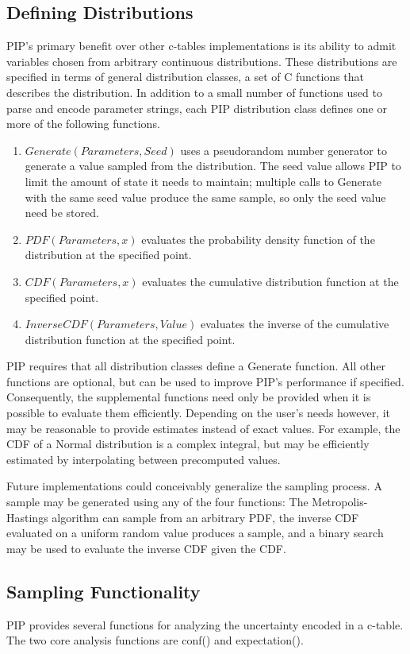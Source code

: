 \subsection{Defining Distributions}
PIP's primary benefit over other c-tables implementations is its ability to admit variables chosen from arbitrary continuous distributions.  These distributions are specified in terms of general distribution classes, a set of C functions that describes the distribution.  In addition to a small number of functions used to parse and encode parameter strings, each PIP distribution class defines one or more of the following functions.
\begin{enumerate}
\item $Generate(Parameters, Seed)$ uses a pseudorandom number generator to generate a value sampled from the distribution.  The seed value allows PIP to limit the amount of state it needs to maintain; multiple calls to Generate with the same seed value produce the same sample, so only the seed value need be stored.
\item $PDF(Parameters, x)$ evaluates the probability density function of the distribution at the specified point.  
\item $CDF(Parameters, x)$ evaluates the cumulative distribution function at the specified point.
\item $InverseCDF(Parameters, Value)$ evaluates the inverse of the cumulative distribution function at the specified point.
\end{enumerate}

PIP requires that all distribution classes define a Generate function.  All other functions are optional, but can be used to improve PIP's performance if specified.  Consequently, the supplemental functions need only be provided when it is possible to evaluate them efficiently.  Depending on the user's needs however, it may be reasonable to provide estimates instead of exact values.  For example, the CDF of a Normal distribution is a complex integral, but may be efficiently estimated by interpolating between precomputed values.  

Future implementations could conceivably generalize the sampling process.  A sample may be generated using any of the four functions: The Metropolis-Hastings algorithm can sample from an arbitrary PDF, the inverse CDF evaluated on a uniform random value produces a sample, and a binary search may be used to evaluate the inverse CDF given the CDF.

\subsection{Sampling Functionality}
PIP provides several functions for analyzing the uncertainty encoded in a c-table.  The two core analysis functions are conf() and expectation().

